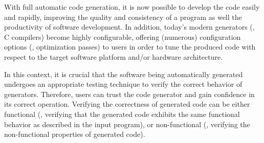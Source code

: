 
 
 
With full automatic code generation, it is now possible to develop the code easily and rapidly, improving the quality and consistency of a program as well the productivity of software development\cite{kapteijns2009comparative}. 
In addition, today's modern generators (\eg, C compilers) become highly configurable, offering
(numerous) configuration options (\eg, optimization passes) to users in order to tune the produced code with respect to the target software platform and/or hardware architecture. 


In this context, it is crucial that the software being automatically generated undergoes an appropriate testing technique to verify the correct behavior of generators. Therefore, users can trust the code generator and gain confidence in its correct operation.  
Verifying the correctness of generated code can be either functional (\eg, verifying that the generated code exhibits the same functional behavior as described in the input program), or non-functional (\eg, verifying the non-functional properties of generated code).

 
 





